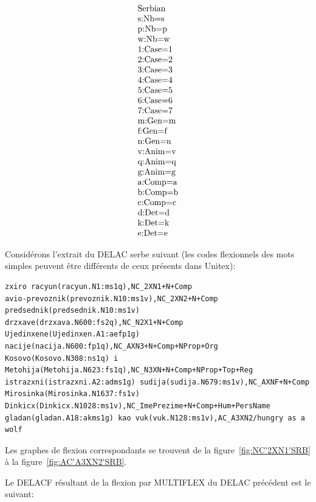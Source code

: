 \[
\begin{array}[l]{l}
$Serbian$ \\
$s:Nb=s$ \\
$p:Nb=p$ \\
$w:Nb=w$ \\
$1:Case=1$ \\
$2:Case=2$ \\
$3:Case=3$ \\
$4:Case=4$ \\
$5:Case=5$ \\
$6:Case=6$ \\
$7:Case=7$ \\
$m:Gen=m$ \\
$f:Gen=f$ \\
$n:Gen=n$ \\
$v:Anim=v$ \\
$q:Anim=q$ \\
$g:Anim=g$ \\
$a:Comp=a$ \\
$b:Comp=b$ \\
$c:Comp=c$ \\
$d:Det=d$ \\
$k:Det=k$ \\
$e:Det=e$
\end{array}
\]

\bigskip
\noindent Considérons l'extrait du DELAC serbe suivant (les codes flexionnels des mots simples
peuvent être différents de ceux présents dans Unitex):
\scriptsize
\begin{verbatim}
zxiro racyun(racyun.N1:ms1q),NC_2XN1+N+Comp
avio-prevoznik(prevoznik.N10:ms1v),NC_2XN2+N+Comp
predsednik(predsednik.N10:ms1v) drzxave(drzxava.N600:fs2q),NC_N2X1+N+Comp
Ujedinxene(Ujedinxen.A1:aefp1g) nacije(nacija.N600:fp1q),NC_AXN3+N+Comp+NProp+Org
Kosovo(Kosovo.N308:ns1q) i Metohija(Metohija.N623:fs1q),NC_N3XN+N+Comp+NProp+Top+Reg 
istrazxni(istrazxni.A2:adms1g) sudija(sudija.N679:ms1v),NC_AXNF+N+Comp
Mirosinka(Mirosinka.N1637:fs1v) Dinkicx(Dinkicx.N1028:ms1v),NC_ImePrezime+N+Comp+Hum+PersName
gladan(gladan.A18:akms1g) kao vuk(vuk.N128:ms1v),AC_A3XN2/hungry as a wolf
\end{verbatim}
\normalsize

\bigskip
\noindent Les graphes de flexion correspondants se trouvent de la figure~\ref{fig:NC'2XN1'SRB} à la
figure~\ref{fig:AC'A3XN2'SRB}. 

\bigskip
\noindent Le DELACF résultant de la flexion par MULTIFLEX du DELAC précédent est le suivant:

